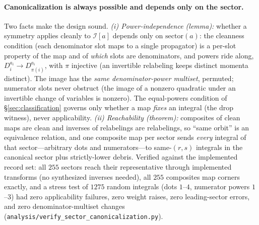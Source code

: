 \documentclass[11pt]{article}
\newcommand{\I}[1]{\mathcal{I}[#1]}
\newcommand{\code}[1]{\texttt{#1}}
\begin{document}
\paragraph{Canonicalization is always possible and depends only on the sector.} Two
facts make the design sound. \emph{(i) Power-independence (lemma):} whether a symmetry
applies cleanly to $\I{a}$ depends only on $\mathrm{sector}(a)$: the cleanness condition
(each denominator slot maps to a single propagator) is a per-slot property of the map
and of \emph{which} slots are denominators, and powers ride along,
$D_i^{a_i}\to D_{\pi(i)}^{a_i}$, with $\pi$ injective (an invertible relabeling keeps
distinct momenta distinct). The image has the \emph{same denominator-power multiset},
permuted; numerator slots never obstruct (the image of a nonzero quadratic under an
invertible change of variables is nonzero). The equal-powers condition of
\S\ref{sec:classification} governs only whether a map \emph{fixes} an integral (the
drop witness), never applicability. \emph{(ii) Reachability (theorem):} composites of
clean maps are clean and inverses of relabelings are relabelings, so ``same orbit'' is
an equivalence relation, and one composite map per sector sends \emph{every} integral
of that sector---arbitrary dots and numerators---to same-$(r,s)$ integrals in the
canonical sector plus strictly-lower debris. Verified against the implemented record
set: all $255$ sectors reach their representative through implemented transforms (no
synthesized inverses needed), all $255$ composites map corners exactly, and a stress
test of $1275$ random integrals (dots $1$--$4$, numerator powers $1$--$3$) had zero
applicability failures, zero weight raises, zero leading-sector errors, and zero
denominator-multiset changes (\code{analysis/verify\_sector\_canonicalization.py}).
\end{document}
